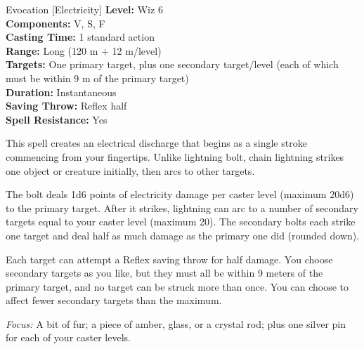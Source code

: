{Evocation [Electricity]}
{
	\textbf{Level:}
	Wiz 6\\
	\textbf{Components:}
	V, S, F\\
	\textbf{Casting Time:}
	1 standard action\\
	\textbf{Range:}
	Long (120 m + 12 m/level)\\
	\textbf{Targets:}
	One primary target, plus one secondary target/level (each of which must be within 9 m of the primary target)\\
	\textbf{Duration:}
	Instantaneous\\
	\textbf{Saving Throw:}
	Reflex half\\
	\textbf{Spell Resistance:}
	Yes\\
}
{
	This spell creates an electrical discharge that begins as a single stroke commencing from your fingertips. Unlike lightning bolt, chain lightning strikes one object or creature initially, then arcs to other targets.

	The bolt deals 1d6 points of electricity damage per caster level (maximum 20d6) to the primary target. After it strikes, lightning can arc to a number of secondary targets equal to your caster level (maximum 20). The secondary bolts each strike one target and deal half as much damage as the primary one did (rounded down).

	Each target can attempt a Reflex saving throw for half damage. You choose secondary targets as you like, but they must all be within 9 meters of the primary target, and no target can be struck more than once. You can choose to affect fewer secondary targets than the maximum.

	\textit{Focus:}
	A bit of fur; a piece of amber, glass, or a crystal rod; plus one silver pin for each of your caster levels.

}
